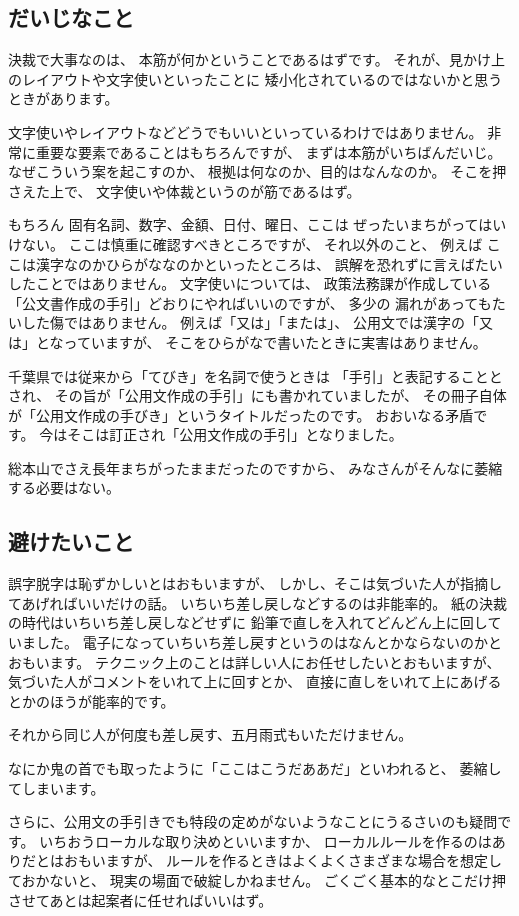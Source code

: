 \documentclass[uplatex,jis2004,dvipdfmx,12pt]{jsarticle}
\begin{document}
\subsection{だいじなこと}
決裁で大事なのは、
本筋が何かということであるはずです。
それが、見かけ上のレイアウトや文字使いといったことに
矮小化されているのではないかと思うときがあります。

文字使いやレイアウトなどどうでもいいといっているわけではありません。
非常に重要な要素であることはもちろんですが、
まずは本筋がいちばんだいじ。
なぜこういう案を起こすのか、
根拠は何なのか、目的はなんなのか。
そこを押さえた上で、
文字使いや体裁というのが筋であるはず。

もちろん
固有名詞、数字、金額、日付、曜日、ここは
ぜったいまちがってはいけない。
ここは慎重に確認すべきところですが、
それ以外のこと、
例えば
ここは漢字なのかひらがななのかといったところは、
誤解を恐れずに言えばたいしたことではありません。
文字使いについては、
政策法務課が作成している「公文書作成の手引」どおりにやればいいのですが、
多少の
漏れがあってもたいした傷ではありません。
例えば「又は」「または」、
公用文では漢字の「又は」となっていますが、
そこをひらがなで書いたときに実害はありません。

千葉県では従来から「てびき」を名詞で使うときは
「手引」と表記することとされ、
その旨が「公用文作成の手引」にも書かれていましたが、
その冊子自体が「公用文作成の手びき」というタイトルだったのです。
おおいなる矛盾です。
今はそこは訂正され「公用文作成の手引」となりました。

総本山でさえ長年まちがったままだったのですから、
みなさんがそんなに萎縮する必要はない。

\subsection{避けたいこと}
誤字脱字は恥ずかしいとはおもいますが、
しかし、そこは気づいた人が指摘してあげればいいだけの話。
いちいち差し戻しなどするのは非能率的。
紙の決裁の時代はいちいち差し戻しなどせずに
鉛筆で直しを入れてどんどん上に回していました。
電子になっていちいち差し戻すというのはなんとかならないのかとおもいます。
テクニック上のことは詳しい人にお任せしたいとおもいますが、
気づいた人がコメントをいれて上に回すとか、
直接に直しをいれて上にあげるとかのほうが能率的です。

それから同じ人が何度も差し戻す、五月雨式もいただけません。

なにか鬼の首でも取ったように「ここはこうだああだ」といわれると、
萎縮してしまいます。

さらに、公用文の手引きでも特段の定めがないようなことにうるさいのも疑問で
す。
いちおうローカルな取り決めといいますか、
ローカルルールを作るのはありだとはおもいますが、
ルールを作るときはよくよくさまざまな場合を想定しておかないと、
現実の場面で破綻しかねません。
ごくごく基本的なとこだけ押させてあとは起案者に任せればいいはず。
\end{document}
